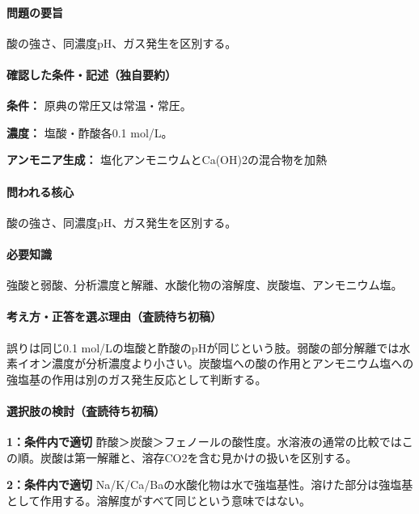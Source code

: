 \paragraph{問題の要旨} 酸の強さ、同濃度pH、ガス発生を区別する。

\paragraph{確認した条件・記述（独自要約）}\mbox{}\par

\noindent\textbf{条件：} 原典の常圧又は常温・常圧。\par

\noindent\textbf{濃度：} 塩酸・酢酸各0.1 mol/L。\par

\noindent\textbf{アンモニア生成：} 塩化アンモニウムとCa(OH)2の混合物を加熱\par

\paragraph{問われる核心} 酸の強さ、同濃度pH、ガス発生を区別する。

\paragraph{必要知識} 強酸と弱酸、分析濃度と解離、水酸化物の溶解度、炭酸塩、アンモニウム塩。

\paragraph{考え方・正答を選ぶ理由（査読待ち初稿）} 誤りは同じ0.1 mol/Lの塩酸と酢酸のpHが同じという肢。弱酸の部分解離では水素イオン濃度が分析濃度より小さい。炭酸塩への酸の作用とアンモニウム塩への強塩基の作用は別のガス発生反応として判断する。

\paragraph{選択肢の検討（査読待ち初稿）}\mbox{}\par

\noindent\textbf{1：条件内で適切} 酢酸＞炭酸＞フェノールの酸性度。水溶液の通常の比較ではこの順。炭酸は第一解離と、溶存CO2を含む見かけの扱いを区別する。\par

\noindent\textbf{2：条件内で適切} Na/K/Ca/Baの水酸化物は水で強塩基性。溶けた部分は強塩基として作用する。溶解度がすべて同じという意味ではない。\par

